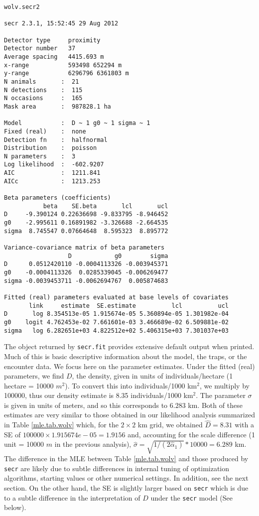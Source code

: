 {\small
\begin{verbatim}
wolv.secr2

secr 2.3.1, 15:52:45 29 Aug 2012

Detector type     proximity 
Detector number   37 
Average spacing   4415.693 m 
x-range           593498 652294 m 
y-range           6296796 6361803 m 
N animals       :  21  
N detections    :  115 
N occasions     :  165 
Mask area       :  987828.1 ha 

Model           :  D ~ 1 g0 ~ 1 sigma ~ 1 
Fixed (real)    :  none 
Detection fn    :  halfnormal 
Distribution    :  poisson 
N parameters    :  3 
Log likelihood  :  -602.9207 
AIC             :  1211.841 
AICc            :  1213.253 

Beta parameters (coefficients) 
           beta    SE.beta       lcl       ucl
D     -9.390124 0.22636698 -9.833795 -8.946452
g0    -2.995611 0.16891982 -3.326688 -2.664535
sigma  8.745547 0.07664648  8.595323  8.895772

Variance-covariance matrix of beta parameters 
                  D            g0        sigma
D      0.0512420110 -0.0004113326 -0.003945371
g0    -0.0004113326  0.0285339045 -0.006269477
sigma -0.0039453711 -0.0062694767  0.005874683

Fitted (real) parameters evaluated at base levels of covariates 
       link     estimate  SE.estimate          lcl          ucl
D       log 8.354513e-05 1.915674e-05 5.360894e-05 1.301982e-04
g0    logit 4.762453e-02 7.661601e-03 3.466689e-02 6.509881e-02
sigma   log 6.282651e+03 4.822512e+02 5.406315e+03 7.301037e+03
\end{verbatim}
}

The object returned by \mbox{\tt secr.fit} provides extensive default
output when printed. Much of this is basic descriptive information
about the model, the traps, or the encounter data. We focus here on
the parameter estimates.
Under the fitted (real) parameters, we find $D$, the density, given in
units of individuals/hectare (1 hectare = 10000 $m^2$).  To convert this
into individuals/1000 km$^2$, we multiply by 100000, thus our density
estimate is 8.35 individuals/1000 km$^2$.  The parameter $\sigma$ is given in units of
meters, and so this corresponds to
 $6.283$ km.  Both of these estimates are very similar to those
obtained in our likelihood analysis summarized in Table \ref{mle.tab.wolv}
which, for the $2 \times 2$ km grid, we obtained $\hat{D} = 8.31$
with a SE of $100000 \times 
1.915674e-05 = 1.9156$
and, accounting for the scale difference (1 unit = 10000 $m$ in the
previous analysis), $\hat{\sigma} = \sqrt{1/(2\hat{\alpha}_{1})}*10000
= 6.289$ km. 
The difference in the MLE between Table \ref{mle.tab.wolv} and those
produced by \mbox{\tt secr} are likely due to subtle differences in  internal
tuning of optimization algorithms, starting values or other numerical
settings. In addition, see the next section.
On the other hand, the SE is slightly larger based on \mbox{\tt secr}
which is due to a subtle difference in the interpretation of $D$ under
the \mbox{\tt secr} model (See below). 






